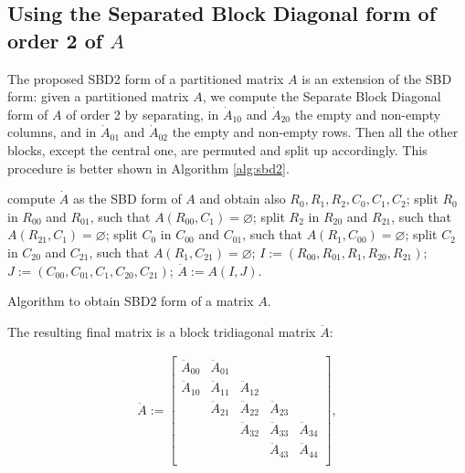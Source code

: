 \subsection{Using the Separated Block Diagonal form of order 2 of $A$}

The proposed SBD2 form of a partitioned matrix $A$ is an extension of the SBD form: given a partitioned matrix $A$, we compute the Separate Block Diagonal form of $A$ of order 2 by separating, in $\dot{A}_{10}$ and $\dot{A}_{20}$ the empty and non-empty columns, and in $\dot{A}_{01}$ and $\dot{A}_{02}$ the empty and non-empty rows. Then all the other blocks, except the central one, are permuted and split up accordingly. This procedure is better shown in Algorithm \ref{alg:sbd2}. 

\begin{algorithm}[h]
	\begin{algorithmic}
		\State compute $\dot{A}$ as the SBD form of $A$ and obtain also $R_0,R_1,R_2,C_0,C_1,C_2$;
		\State split $R_0$ in $R_{00}$ and $R_{01}$, such that $A(R_{00},C_1) = \varnothing$;
		\State split $R_2$ in $R_{20}$ and $R_{21}$, such that $A(R_{21},C_1) = \varnothing$;
		\State split $C_0$ in $C_{00}$ and $C_{01}$, such that $A(R_1,C_{00}) = \varnothing$;
		\State split $C_2$ in $C_{20}$ and $C_{21}$, such that $A(R_1,C_{21}) = \varnothing$;
		\State $I:= (R_{00},R_{01},R_1,R_{20},R_{21})$;
		\State $J:= (C_{00},C_{01},C_1,C_{20},C_{21})$;
		\State $\ddot{A} := A(I,J)$.
	\end{algorithmic}
	\caption{Algorithm to obtain SBD2 form of a matrix $A$.} \label{alg:sbd2}
\end{algorithm} 

The resulting final matrix is a block tridiagonal matrix $\ddot{A}$:

\begin{align}
	\ddot{A} := \begin{bmatrix}
		\ddot{A}_{00} & \ddot{A}_{01} & & & \\
		\ddot{A}_{10} & \ddot{A}_{11} & \ddot{A}_{12} & & \\
		& \ddot{A}_{21} & \ddot{A}_{22} & \ddot{A}_{23} & \\
		& & \ddot{A}_{32} & \ddot{A}_{33} & \ddot{A}_{34} \\
		& & & \ddot{A}_{43} & \ddot{A}_{44} \\
	\end{bmatrix},
	\label{eq:sbd2}
\end{align}

